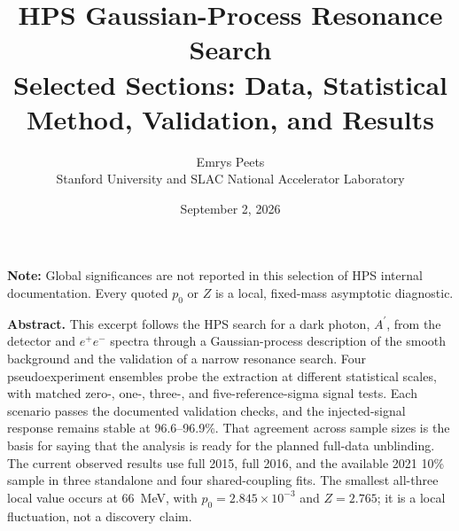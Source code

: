 \documentclass[11pt]{article}
\title{\vspace{1.3in}HPS Gaussian-Process Resonance Search\\[0.5em]
\large Selected Sections: Data, Statistical Method, Validation, and Results}
\author{
Emrys Peets\\Stanford University and SLAC National Accelerator Laboratory
}
\date{September 2, 2026}
\begin{document}
\hypersetup{pageanchor=false}
\begin{titlepage}
\maketitle
\vfill
\begin{center}
\begin{minipage}{0.84\textwidth}
\small
\textbf{Note:} Global significances are not reported in this selection of HPS
internal documentation. Every quoted $p_0$ or $Z$ is a local, fixed-mass asymptotic
diagnostic.

\medskip
\textbf{Abstract.} This excerpt follows the HPS search for a
dark photon, $A^\prime$, from the detector and $e^+e^-$ spectra through a
Gaussian-process description of the smooth background and the validation of a narrow
resonance search. Four pseudoexperiment ensembles probe the extraction at different
statistical scales, with matched zero-, one-, three-, and five-reference-sigma signal
tests. Each scenario passes the documented validation checks, and the injected-signal
response remains stable at 96.6--96.9\%. That agreement across sample sizes is the
basis for saying that the analysis is ready for the planned full-data unblinding. The
current observed results use full 2015, full 2016, and the available 2021 10\% sample
in three standalone and four shared-coupling fits. The smallest all-three local value
occurs at 66~MeV, with $p_0=2.845\times10^{-3}$ and $Z=2.765$; it is a local
fluctuation, not a discovery claim.
\end{minipage}
\end{center}
\vfill
\thispagestyle{empty}
\end{titlepage}

\hypersetup{pageanchor=true}
\setcounter{page}{1}
\setcounter{section}{1}
\setcounter{tocdepth}{2}
\tableofcontents
\clearpage


\FloatBarrier
\clearpage


\FloatBarrier
\clearpage


\FloatBarrier
\clearpage


\FloatBarrier

\clearpage

\FloatBarrier

\clearpage


\end{document}
